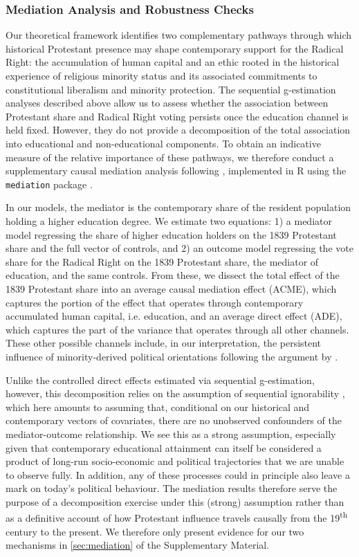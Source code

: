 \documentclass[12pt]{article}
\begin{document}
\subsubsection{Mediation Analysis and Robustness Checks}
Our theoretical framework identifies two complementary pathways through which historical Protestant presence may shape contemporary support for the Radical Right: the accumulation of human capital and an ethic rooted in the historical experience of religious minority status and its associated commitments to constitutional liberalism and minority protection. The sequential g-estimation analyses described above allow us to assess whether the association between Protestant share and Radical Right voting persists once the education channel is held fixed. However, they do not provide a decomposition of the total association into educational and non-educational components. To obtain an indicative measure of the relative importance of these pathways, we therefore conduct a supplementary causal mediation analysis following \textcite{imai2010general}, implemented in R using the \texttt{mediation} package \parencite{tingley2014mediation}.

In our models, the mediator is the contemporary share of the resident population holding a higher education degree. We estimate two equations: 1) a mediator model regressing the share of higher education holders on the 1839 Protestant share and the full vector of controls, and 2) an outcome model regressing the vote share for the Radical Right on the 1839 Protestant share, the mediator of education, and the same controls. From these, we dissect the total effect of the 1839 Protestant share into an average causal mediation effect (ACME), which captures the portion of the effect that operates through contemporary accumulated human capital, i.e. education, and an average direct effect (ADE), which captures the part of the variance that operates through all other channels. These other possible channels include, in our interpretation, the persistent influence of minority-derived political orientations following the argument by \textcite{rovnyAntidoteBackslidingEthnic2023, rovnyEthnicMinoritiesPolitical2024}. 

Unlike the controlled direct effects estimated via sequential g-estimation, however, this decomposition relies on the assumption of sequential ignorability \parencite{imai2010general, imai2010identification}, which here amounts to assuming that, conditional on our historical and contemporary vectors of covariates, there are no unobserved confounders of the mediator-outcome relationship. We see this as a strong assumption, especially given that contemporary educational attainment can itself be considered a product of long-run socio-economic and political trajectories that we are unable to observe fully. In addition, any of these processes could in principle also leave a mark on today's political behaviour. The mediation results therefore serve the purpose of a decomposition exercise under this (strong) assumption rather than as a definitive account of how Protestant influence travels causally from the 19\textsuperscript{th} century to the present. We therefore only present evidence for our two mechanisms in \autoref{sec:mediation} of the Supplementary Material.
\end{document}
